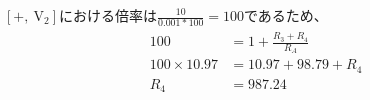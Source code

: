 \documentclass[a4paper,11pt]{jsarticle}
\begin{document}
$[+,\ \mathrm{V_{2}}]$における倍率は$\frac{10}{0.001*100}=100$であるため、
\begin{align}
  \begin{split}
    100
    &=1+\frac{R_{3}+R_{4}}{R_{A}}\\
    100\times 10.97
    &=10.97+98.79+R_{4}\\
    R_{4}
    &=987.24
    \label{eq5}
  \end{split}
\end{align}
\end{document}
